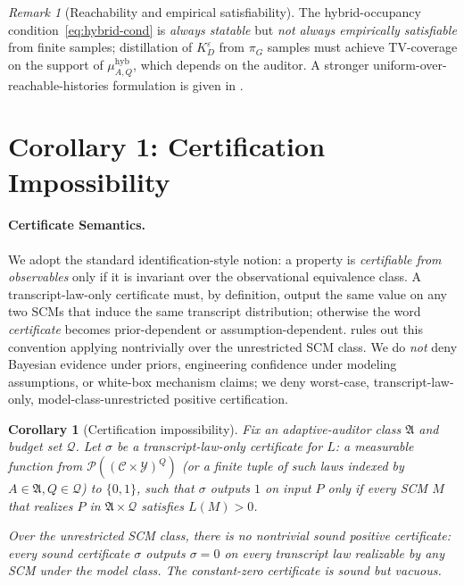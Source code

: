 \documentclass{article}
\theoremstyle{plain}
\newtheorem{corollary}[theorem]{Corollary}
\theoremstyle{definition}
\theoremstyle{remark}
\newtheorem{remark}[theorem]{Remark}
\newcommand{\C}{\mathcal{C}}
\newcommand{\Y}{\mathcal{Y}}
\begin{document}
\begin{remark}[Reachability and empirical satisfiability]
The hybrid-occupancy condition~\eqref{eq:hybrid-cond} is \emph{always statable}
but \emph{not always empirically satisfiable} from finite samples; distillation
of $K_D^\varepsilon$ from $\pi_G$ samples must achieve TV-coverage on the
support of $\mu_{A, Q}^{\mathrm{hyb}}$, which depends on the auditor. A
stronger uniform-over-reachable-histories formulation is given in
.
\end{remark}

\section{Corollary 1: Certification Impossibility}\label{sec:cor-1}

\paragraph{Certificate Semantics.}
We adopt the standard identification-style notion: a property is
\emph{certifiable from observables} only if it is invariant over the
observational equivalence class. A transcript-law-only certificate must,
by definition, output the same value on any two SCMs that induce the same
transcript distribution; otherwise the word \emph{certificate} becomes
prior-dependent or assumption-dependent.  rules
out this convention applying nontrivially over the unrestricted SCM class.
We do \emph{not} deny Bayesian evidence under priors, engineering confidence
under modeling assumptions, or white-box mechanism claims; we deny worst-case,
transcript-law-only, model-class-unrestricted positive certification.

\begin{corollary}[Certification impossibility]\label{cor:cert-imp}
Fix an adaptive-auditor class $\mathfrak A$ and budget set $\mathcal Q$.
Let $\sigma$ be a \emph{transcript-law-only certificate} for $L$:
a measurable function from $\mathcal P((\C \times \Y)^Q)$
(or a finite tuple of such laws indexed by $A \in \mathfrak A, Q \in \mathcal Q$)
to $\{0, 1\}$, such that $\sigma$ outputs $1$ on input $P$ only if every SCM
$M$ that realizes $P$ in $\mathfrak{A} \times \mathcal Q$
satisfies $L(M) > 0$.

Over the unrestricted SCM class, there is \emph{no nontrivial sound positive
certificate}: every sound certificate $\sigma$ outputs $\sigma = 0$ on every
transcript law realizable by any SCM under the model class. The constant-zero
certificate is sound but vacuous.
\end{corollary}
\end{document}
